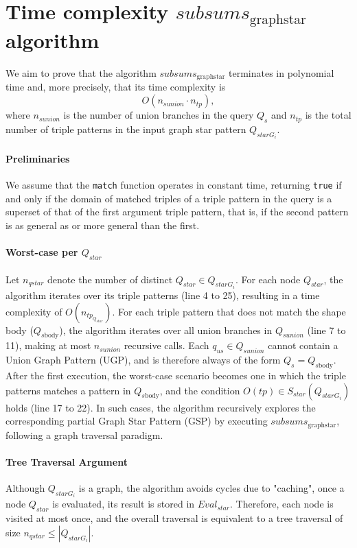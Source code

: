 \section{Time complexity $subsums_{\mathrm{graph star}}$ algorithm}




We aim to prove that the algorithm $subsums_{\mathrm{graph star}}$ terminates in polynomial time and, more precisely, that its time complexity is
\begin{equation}
O(n_{sunion} \cdot n_{tp}),
\end{equation}
where $n_{sunion}$ is the number of union branches in the query $Q_s$ and $n_{tp}$ is the total number of triple patterns in the input graph star pattern $Q_{starG_i}$.

\paragraph{Preliminaries}
We assume that the \texttt{match} function operates in constant time, returning \texttt{true} if and only if the domain of matched triples of a triple pattern in the query is a superset of that of the first argument triple pattern, that is, if the second pattern is as general as or more general than the first.

\paragraph{Worst-case per $Q_{star}$}
Let $n_{qstar}$ denote the number of distinct $Q_{star} \in Q_{starG_i}$.
For each node $Q_{star}$, the algorithm iterates over its triple patterns (line 4 to 25), resulting in a time complexity of $O(n_{tp_{Q_{star}}})$.
For each triple pattern that does not match the shape body ($Q_{s\mathrm{body}}$), the algorithm iterates over all union branches in $Q_{sunion}$ (line 7 to 11), making at most $n_{sunion}$ recursive calls.
Each $q_{us} \in Q_{sunion}$ cannot contain a Union Graph Pattern (UGP), and is therefore always of the form $Q_s = Q_{s\mathrm{body}}$.
After the first execution, the worst-case scenario becomes one in which the triple patterns matches a pattern in $Q_{s\mathrm{body}}$, and the condition $O(tp) \in S_{star}(Q_{starG_i})$ holds (line 17 to 22).
In such cases, the algorithm recursively explores the corresponding partial Graph Star Pattern (GSP) by executing $subsums_{\mathrm{graph star}}$, following a graph traversal paradigm.


\paragraph{Tree Traversal Argument}
Although $Q_{starG_i}$ is a graph, the algorithm avoids cycles due to "caching", once a node $Q_{star}$ is evaluated, its result is stored in $Eval_{star}$.
Therefore, each node is visited at most once, and the overall traversal is equivalent to a tree traversal of size $n_{qstar} \leq |Q_{starG_i}|$.

